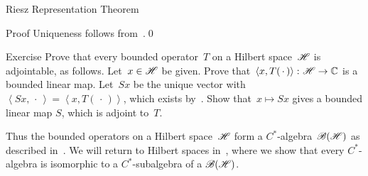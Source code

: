 \documentclass[main]{subfiles}
\begin{document}
\begin{parsec}
\begin{point}{Riesz Representation Theorem}
\begin{point}{Proof}
Uniqueness follows from~.\qed
\end{point}
\end{point}
\begin{point}{Exercise}%
Prove that every bounded operator~$T$ on a Hilbert space~$\mathscr{H}$
is adjointable, as follows.
Let~$x\in \mathscr{H}$ be given.
Prove that~$\left<x,T(\,\cdot\,)\right>\colon \mathscr{H}\to \mathbb{C}$
is a bounded linear map.
Let~$Sx$ be the unique vector with $\left<Sx,\,\cdot\,\right>
=\left<x,T(\,\cdot\,)\right>$,
which exists by~.
Show that~$x\mapsto Sx$
gives a bounded linear map $S$, which is adjoint to~$T$.
\end{point}
\begin{point}%
Thus the bounded operators
on a Hilbert space~$\mathscr{H}$
form a $C^*$-algebra~$\mathscr{B}(\mathscr{H})$
as described in~.
We will return to Hilbert spaces
in~,
where we show that every $C^*$-algebra
is isomorphic to a $C^*$-subalgebra of
a $\mathscr{B}(\mathscr{H})$.
\end{point}
\end{parsec}
\end{document}
